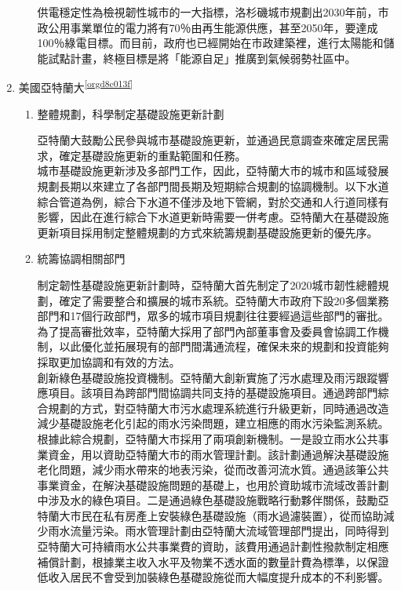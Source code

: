 \documentclass[a4paper,12pt]{article}
\begin{document}
\begin{enumerate}
\begin{enumerate}
供電穩定性為檢視韌性城市的一大指標，洛杉磯城市規劃出2030年前，市政公用事業單位的電力將有70％由再生能源供應，甚至2050年，要達成100％綠電目標。而目前，政府也已經開始在市政建築裡，進行太陽能和儲能試點計畫，終極目標是將「能源自足」推廣到氣候弱勢社區中。\\
\end{enumerate}

\item 美國亞特蘭大\textsuperscript{\ref{orgd8c013f}}
\label{sec:org8e582ee}

\begin{enumerate}
\item 整體規劃，科學制定基礎設施更新計劃
\label{sec:org9855d53}

亞特蘭大鼓勵公民參與城市基礎設施更新，並通過民意調查來確定居民需求，確定基礎設施更新的重點範圍和任務。\\

城市基礎設施更新涉及多部門工作，因此，亞特蘭大市的城市和區域發展規劃長期以來建立了各部門間長期及短期綜合規劃的協調機制。以下水道綜合管道為例，綜合下水道不僅涉及地下管網，對於交通和人行道同樣有影響，因此在進行綜合下水道更新時需要一併考慮。亞特蘭大在基礎設施更新項目採用制定整體規劃的方式來統籌規劃基礎設施更新的優先序。\\

\item 統籌協調相關部門
\label{sec:org745b5c9}

制定韌性基礎設施更新計劃時，亞特蘭大首先制定了2020城市韌性總體規劃，確定了需要整合和擴展的城市系統。亞特蘭大市政府下設20多個業務部門和17個行政部門，眾多的城市項目規劃往往要經過這些部門的審批。為了提高審批效率，亞特蘭大採用了部門內部董事會及委員會協調工作機制，以此優化並拓展現有的部門間溝通流程，確保未來的規劃和投資能夠採取更加協調和有效的方法。\\

創新綠色基礎設施投資機制。亞特蘭大創新實施了污水處理及雨污跟蹤響應項目。該項目為跨部門間協調共同支持的基礎設施項目。通過跨部門綜合規劃的方式，對亞特蘭大市污水處理系統進行升級更新，同時通過改造減少基礎設施老化引起的雨水污染問題，建立相應的雨水污染監測系統。\\

根據此綜合規劃，亞特蘭大市採用了兩項創新機制。一是設立雨水公共事業資金，用以資助亞特蘭大市的雨水管理計劃。該計劃通過解決基礎設施老化問題，減少雨水帶來的地表污染，從而改善河流水質。通過該筆公共事業資金，在解決基礎設施問題的基礎上，也用於資助城市流域改善計劃中涉及水的綠色項目。二是通過綠色基礎設施戰略行動夥伴關係，鼓勵亞特蘭大市民在私有房產上安裝綠色基礎設施（雨水過濾裝置），從而協助減少雨水流量污染。雨水管理計劃由亞特蘭大流域管理部門提出，同時得到亞特蘭大可持續雨水公共事業費的資助，該費用通過計劃性撥款制定相應補償計劃，根據業主收入水平及物業不透水面的數量計費為標準，以保證低收入居民不會受到加裝綠色基礎設施從而大幅度提升成本的不利影響。\\
\end{enumerate}


\end{enumerate}
\end{document}
